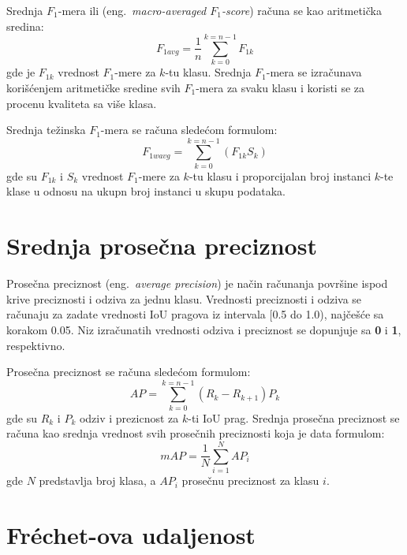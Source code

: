 \documentclass[12pt,oneside]{memoir}
\begin{document}
Srednja $F_1$-mera ili (eng.~\textit{macro-averaged $F_1$-score}) računa se kao aritmetička sredina:
\begin{equation}
\label{eq:f1a}
    F_{1avg} = \frac{1}{n}\sum_{k=0}^{k=n-1} F_{1k}
\end{equation}
gde je \(F_{1k}\) vrednost $F_1$-mere za \(k\)-tu klasu. Srednja $F_1$-mera se izračunava korišćenjem aritmetičke sredine svih $F_1$-mera za svaku klasu i koristi se za procenu kvaliteta sa više klasa.

Srednja težinska $F_1$-mera se računa sledećom formulom:
\begin{equation}
\label{eq:f1wa}
    F_{1wavg} = \sum_{k=0}^{k=n-1} (F_{1k} S_{k})
\end{equation}
gde su \(F_{1k}\) i \(S_{k}\) vrednost $F_1$-mere za \(k\)-tu klasu i proporcijalan broj instanci \(k\)-te klase u odnosu na ukupn broj instanci u skupu podataka.

\section{Srednja prosečna preciznost}
\label{section4_avgprecision}

Prosečna preciznost (eng.~\textit{average precision}) je način računanja površine ispod krive preciznosti i odziva za jednu klasu. Vrednosti preciznosti i odziva se računaju za zadate vrednosti IoU pragova iz intervala [0.5 do 1.0), najčešće sa korakom 0.05.
Niz izračunatih vrednosti odziva i preciznost se dopunjuje sa \textbf{0} i \textbf{1}, respektivno. 

Prosečna preciznost se računa sledećom formulom:
\begin{equation}
\label{eq:ap}
    AP = \sum_{k=0}^{k=n-1} (R_{k} - R_{k+1})P_{k}
\end{equation}
gde su \(R_{k}\) i \(P_{k}\) odziv i prezicnost za \(k\)-ti IoU prag.
Srednja prosečna preciznost se računa kao srednja vrednost svih prosečnih preciznosti koja je data formulom:
\begin{equation}
\label{eq:map}
    mAP =\frac{1}{N} \sum_{i=1}^{N} AP_{i}
\end{equation}
gde \(N\) predstavlja broj klasa, a \(AP_{i}\) prosečnu preciznost za klasu 
\(i\).

\section{Fréchet-ova udaljenost}
\end{document}
